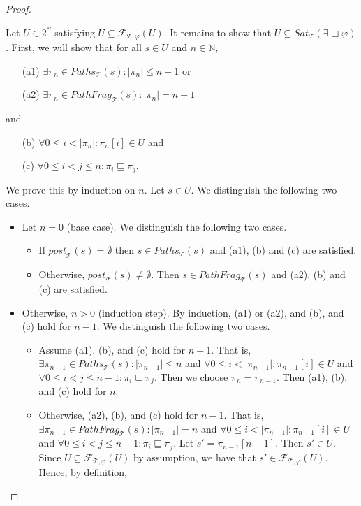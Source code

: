 \documentclass[12pt]{article}
\newcommand{\always}{\Box}
\theoremstyle{definition}
\begin{document}
\begin{proof}
\begin{itemize}
Let $U \in 2^S$ satisfying $U \subseteq \mathcal{F}_{\mathcal{T}, \varphi}(U)$.  It remains to show that $U \subseteq \mathit{Sat}_{\mathcal{T}}(\exists \always \varphi)$.  First, we will show that for all $s \in U$ and $n \in \mathbb{N}$,
\begin{itemize}
\item[(a1)]
$\exists \pi_n \in \mathit{Paths}_{\mathcal{T}}(s) : |\pi_n| \leq n + 1$ or
\item[(a2)]
$\exists \pi_n \in \mathit{PathFrag}_{\mathcal{T}}(s) : |\pi_n| = n + 1$
\end{itemize}
and 
\begin{itemize}
\item[(b)]
$\forall 0 \leq i < |\pi_n| : \pi_n[i] \in U$ and
\item[(c)]
 $\forall 0 \leq i < j \leq n: \pi_i \sqsubseteq \pi_j$.
\end{itemize}
We prove this by induction on $n$.  Let $s \in U$.  We distinguish the following two cases.
\begin{itemize}
\item 
Let $n = 0$ (base case).  We distinguish the following two cases.
\begin{itemize}
\item 
If $\mathit{post}_{\mathcal{T}}(s) = \emptyset$ then $s \in \mathit{Paths}_{\mathcal{T}}(s)$ and (a1), (b) and (c) are satisfied.
\item
Otherwise, $\mathit{post}_{\mathcal{T}}(s) \not= \emptyset$.  Then $s \in \mathit{PathFrag}_{\mathcal{T}}(s)$ and (a2), (b) and (c) are satisfied.
\end{itemize} 
\item
Otherwise, $n > 0$ (induction step).  By induction, (a1) or (a2), and (b), and (c) hold for $n-1$.  We distinguish the following two cases.
\begin{itemize}
\item 
Assume (a1), (b), and (c) hold for $n-1$.  That is, $\exists \pi_{n-1} \in \mathit{Paths}_{\mathcal{T}}(s) : |\pi_{n-1}| \leq n$ and $\forall 0 \leq i < |\pi_{n-1}| : \pi_{n-1}[i] \in U$ and $\forall 0 \leq i < j \leq n - 1: \pi_i \sqsubseteq \pi_j$.  Then we choose $\pi_n = \pi_{n-1}$.  Then (a1), (b), and (c) hold for $n$.
\item
Otherwise, (a2), (b), and (c) hold for $n-1$.  That is, $\exists \pi_{n-1} \in \mathit{PathFrag}_{\mathcal{T}}(s) : |\pi_{n-1}| = n$  and $\forall 0 \leq i < |\pi_{n-1}| : \pi_{n-1}[i] \in U$ and $\forall 0 \leq i < j \leq n - 1: \pi_i \sqsubseteq \pi_j$.  Let $s' = \pi_{n-1}[n-1]$.  Then $s' \in U$.  Since $U \subseteq \mathcal{F}_{\mathcal{T}, \varphi}(U)$ by assumption, we have that $s' \in \mathcal{F}_{\mathcal{T}, \varphi}(U)$.  Hence, by definition, 

\end{itemize}
\end{itemize}
\end{itemize}
\end{proof}
\end{document}
